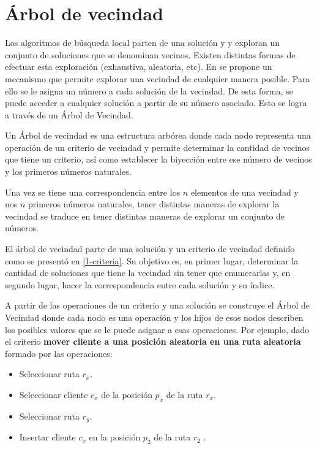 
\section{Árbol de vecindad}\label{2-Hector}
Los algoritmos de búsqueda local parten de una solución y y exploran un conjunto de soluciones que se denominan vecinos. Existen distintas formas de efectuar esta exploración (exhaustiva, aleatoria, etc). En \cite{Hector} se propone un mecanismo que permite explorar una vecindad de cualquier manera posible. Para ello se le asigna un número a cada solución de la vecindad. De esta forma, se puede acceder a cualquier solución a partir de su número asociado. Esto se logra a través de un Árbol de Vecindad.

Un Árbol de vecindad es una estructura arbórea donde cada nodo representa una operación de un criterio de vecindad y permite determinar la cantidad de vecinos que tiene un criterio, así como establecer la biyección entre ese número de vecinos y los primeros números naturales.

Una vez se tiene una correspondencia entre los $n$ elementos de una vecindad y nos $n$ primeros números naturales, tener distintas maneras de explorar la vecindad se traduce en tener distintas maneras de explorar un conjunto de números. 


El árbol de vecindad parte de una solución y un criterio de vecindad definido como se presentó en \ref{1-criteria}. Su objetivo es, en primer lugar, determinar la cantidad de soluciones que tiene la vecindad sin tener que enumerarlas y, en segundo lugar, hacer la correspondencia entre cada solución y su índice.

A partir de las operaciones de un criterio y una solución se construye el Árbol de Vecindad donde cada nodo es una operación y los hijos de esos nodos describen los posibles valores que se le puede asignar a esas operaciones. Por ejemplo, dado el criterio \textbf{mover cliente a una posición aleatoria en una ruta aleatoria} formado por las operaciones: 

\begin{itemize}
	\item Seleccionar ruta \textbf{$r_x$}.
	\item Seleccionar cliente \textbf{$c_x$} de la posición \textbf{$p_x$} de la ruta \textbf{$r_x$}.
	\item Seleccionar ruta \textbf{$r_y$}.
	\item Insertar cliente \textbf{$c_x$} en la posición \textbf{$p_2$} de la ruta \textbf{$r_2$} .
\end{itemize}

